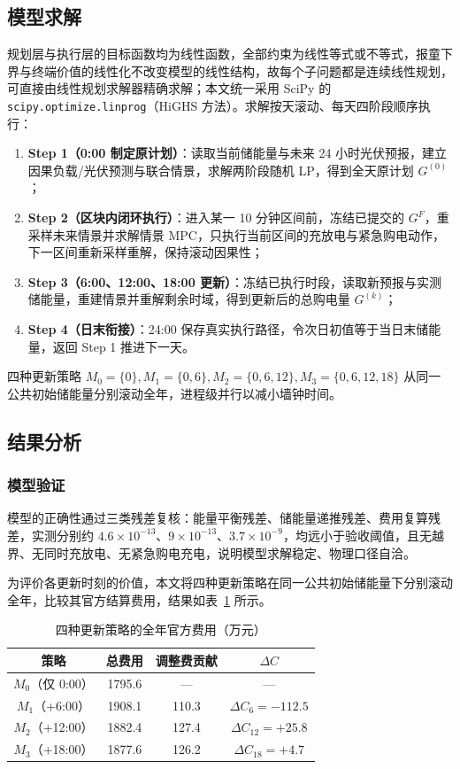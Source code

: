 \subsection{模型求解}

规划层与执行层的目标函数均为线性函数，全部约束为线性等式或不等式，报童下界与终端价值的线性化不改变模型的线性结构，故每个子问题都是连续线性规划，可直接由线性规划求解器精确求解；本文统一采用 SciPy 的 \texttt{scipy.optimize.linprog}（HiGHS 方法）。求解按天滚动、每天四阶段顺序执行：

\begin{enumerate}
  \item \textbf{Step 1（0:00 制定原计划）}：读取当前储能量与未来 24 小时光伏预报，建立因果负载/光伏预测与联合情景，求解两阶段随机 LP，得到全天原计划 $G^{(0)}$；
  \item \textbf{Step 2（区块内闭环执行）}：进入某一 10 分钟区间前，冻结已提交的 $G^F$，重采样未来情景并求解情景 MPC，只执行当前区间的充放电与紧急购电动作，下一区间重新采样重解，保持滚动因果性；
  \item \textbf{Step 3（6:00、12:00、18:00 更新）}：冻结已执行时段，读取新预报与实测储能量，重建情景并重解剩余时域，得到更新后的总购电量 $G^{(k)}$；
  \item \textbf{Step 4（日末衔接）}：24:00 保存真实执行路径，令次日初值等于当日末储能量，返回 Step 1 推进下一天。
\end{enumerate}

四种更新策略 $M_0=\{0\},M_1=\{0,6\},M_2=\{0,6,12\},M_3=\{0,6,12,18\}$ 从同一公共初始储能量分别滚动全年，进程级并行以减小墙钟时间。

\subsection{结果分析}

\subsubsection{模型验证}

模型的正确性通过三类残差复核：能量平衡残差、储能量递推残差、费用复算残差，实测分别约 $4.6\times10^{-13}$、$9\times10^{-13}$、$3.7\times10^{-9}$，均远小于验收阈值，且无越界、无同时充放电、无紧急购电充电，说明模型求解稳定、物理口径自洽。

为评价各更新时刻的价值，本文将四种更新策略在同一公共初始储能量下分别滚动全年，比较其官方结算费用，结果如表~\ref{tab:cost3} 所示。

\begin{table}[htbp]
\centering
\caption{四种更新策略的全年官方费用（万元）}
\label{tab:cost3}
\begin{tabular}{cccc}
\toprule
策略 & 总费用 & 调整费贡献 & $\Delta C$ \\
\midrule
$M_0$（仅 0:00） & 1795.6 & --- & --- \\
$M_1$（+6:00） & 1908.1 & 110.3 & $\Delta C_6=-112.5$ \\
$M_2$（+12:00） & 1882.4 & 127.4 & $\Delta C_{12}=+25.8$ \\
$M_3$（+18:00） & 1877.6 & 126.2 & $\Delta C_{18}=+4.7$ \\
\bottomrule
\end{tabular}
\end{table}

